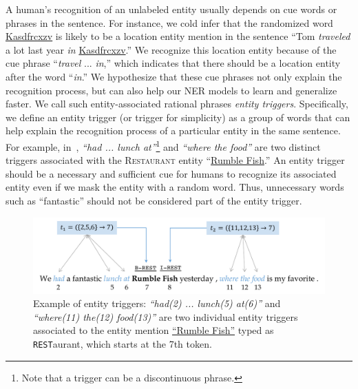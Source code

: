 A human's recognition of an unlabeled entity usually depends on cue words or  phrases in the sentence. For instance, we cold infer that the randomized word \underline{Kasdfrcxzv} is likely to be a location entity mention in the sentence ``Tom \textit{traveled} a lot last year \textit{in} \underline{Kasdfrcxzv}.'' We recognize this location entity because of the cue phrase ``\textit{travel} ... \textit{in},'' which indicates that there should be a location entity after the word ``\textit{in}.'' We hypothesize that these cue phrases not only explain the recognition process, but can also help our NER models to learn and generalize faster. We call such entity-associated rational phrases \textit{entity triggers}. Specifically, we define an entity trigger (or trigger for simplicity) as a group of words that can help explain the recognition process of a particular entity in the same sentence. For example, in~, \textit{``had ... lunch at''}\footnote{Note that a trigger can be a discontinuous phrase.} and \textit{``where the food''} are two distinct triggers associated with the \textsc{Restaurant} entity ``\underline{Rumble Fish}.'' An entity trigger should be a necessary and sufficient cue for humans to recognize its associated entity even if we mask the entity with a random word. Thus, unnecessary words such as ``fantastic'' should not be  considered part of the entity trigger.

\begin{figure}[h]
	\centering
	\includegraphics[width=0.85\linewidth]{LatexDiss/figures/trigexample.pdf}
	\caption{Example of entity triggers: \textit{``had(2) ... lunch(5) at(6)''} and \textit{``where(11) the(12) food(13)''} are two individual entity triggers associated to the entity mention {\underline{``Rumble Fish''}} typed as \texttt{REST}aurant, which starts at the 7th token.}
	\label{fig:trigex}
\end{figure}

